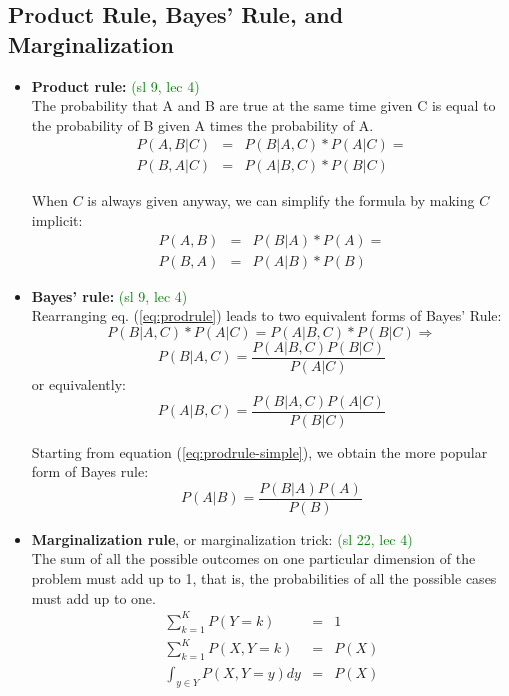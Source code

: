 \subsection{Product Rule, Bayes' Rule, and Marginalization}

\begin{itemize}

\item {\bf Product rule:} \textcolor{green}{(sl 9, lec 4)} \\
The probability that A and B are true at the same time given C is equal to
the probability of B given A times the probability of A.
\begin{eqnarray}
P(A,B|C) & = & P(B|A,C)*P(A|C) = \nonumber \\
P(B,A|C) & = & P(A|B,C)*P(B|C)   \label{eq:prodrule}
\end{eqnarray}

When $C$ is always given anyway, we can simplify the formula by making $C$ implicit:
\begin{eqnarray}
P(A,B) & = & P(B|A)*P(A) = \nonumber \\
P(B,A) & = & P(A|B)*P(B)   \label{eq:prodrule-simple}
\end{eqnarray}

\item {\bf Bayes' rule:} \textcolor{green}{(sl 9, lec 4)} \\

Rearranging eq. (\ref{eq:prodrule}) leads to two equivalent forms of Bayes' Rule:
\begin{equation}
P(B|A,C)*P(A|C) = P(A|B,C)*P(B|C) \Rightarrow \nonumber
\end{equation}
\begin{equation}
\boxed{P(B|A,C) = \frac{P(A|B,C) P(B|C)}{P(A|C)}}
\end{equation}
or equivalently:
\begin{equation}
\boxed{P(A|B,C) = \frac{P(B|A,C) P(A|C)}{P(B|C)}}
\end{equation}

Starting from equation (\ref{eq:prodrule-simple}), we obtain the more popular form of Bayes rule:
\begin{equation}
P(A|B) = \frac{P(B|A) P(A)}{P(B)}
\end{equation}

\item {\bf Marginalization rule}, or marginalization trick: \textcolor{green}{(sl 22, lec 4)} \\
The sum of all the possible outcomes on one particular dimension of the problem must add up to 1, that is, the probabilities of all the possible cases must add up to one.
\begin{eqnarray}
\sum_{k=1}^K P(Y=k) & = & 1 \\
\sum_{k=1}^K P(X,Y=k) & = & P(X) \\
\int_{y \in Y} P(X,Y=y) dy & = & P(X)
\end{eqnarray}


\end{itemize}
